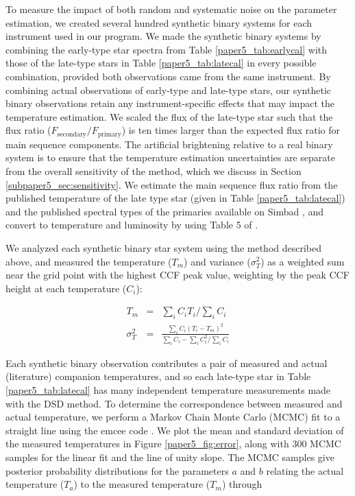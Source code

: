 To measure the impact of both random and systematic noise on the parameter estimation, we created several hundred synthetic binary systems for each instrument used in our program. We made the synthetic binary systems by combining the early-type star spectra from Table \ref{paper5_tab:earlycal} with those of the late-type stars in Table \ref{paper5_tab:latecal} in every possible combination, provided both observations came from the same instrument. By combining actual observations of early-type and late-type stars, our synthetic binary observations retain any instrument-specific effects that may impact the temperature estimation. We scaled the flux of the late-type star such that the flux ratio ($F_\mathrm{secondary}/F_\mathrm{primary}$) is ten times larger than the expected flux ratio for main sequence components. The artificial brightening relative to a real binary system is to ensure that the temperature estimation uncertainties are separate from the overall sensitivity of the method, which we discuss in Section \ref{subpaper5_sec:sensitivity}. We estimate the main sequence flux ratio from the published temperature of the late type star (given in Table \ref{paper5_tab:latecal}) and the published spectral types of the primaries available on Simbad \citep{Simbad}, and convert to temperature and luminosity by using Table 5 of \citet{Pecaut2013}.


We analyzed each synthetic binary star system using the method described above, and measured the temperature ($T_m$) and variance ($\sigma_T^2$) as a weighted sum near the grid point with the highest CCF peak value, weighting by the peak CCF height at each temperature ($C_i$):

\begin{eqnarray}
\label{paper5_eqn:tmeas} 
T_m &=& \sum_i C_i T_i / \sum_i C_i \\
\sigma_T^2 &=& \frac{\sum_i C_i (T_i - T_m)^2}{ \sum_i C_i - \sum_i C_i^2 / \sum_i C_i}
\end{eqnarray}

Each synthetic binary observation contributes a pair of measured and actual (literature) companion temperatures, and so each late-type star in Table \ref{paper5_tab:latecal} has many independent temperature measurements made with the DSD method. To determine the correspondence between measured and actual temperature, we perform a Markov Chain Monte Carlo (MCMC) fit to a straight line using the emcee code \citep{emcee}. We plot the mean and standard deviation of the measured temperatures in Figure \ref{paper5_fig:error}, along with 300 MCMC samples for the linear fit and the line of unity slope. The MCMC samples give posterior probability distributions for the parameters $a$ and $b$ relating the actual temperature ($T_a$) to the measured temperature ($T_m$) through

